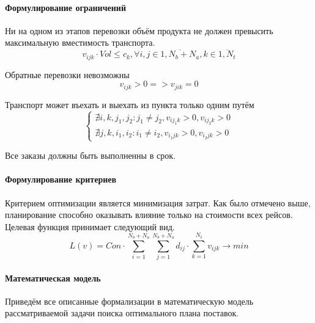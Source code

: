 	\paragraph{Формулирование ограничений}     
	Ни на одном из этапов перевозки объём продукта не должен превысить максимальную вместимость транспорта.
	\begin{equation}
		v_{ijk} \cdot Vol \le c_k, \forall i, j \in \overline{1, N_b+N_a}, k \in \overline{1, N_t}
	\end{equation}

	Обратные перевозки невозможны
	\begin{equation}
		v_{ijk} > 0 => v_{jik} = 0
	\end{equation}

	Транспорт может въехать и выехать из пункта только одним путём
	\begin{equation}
		\left\lbrace 
		\begin{array}{cols}
			\nexists i, k, j_1, j_2: j_1 \ne j_2, v_{ij_1k} > 0, v_{ij_2k} > 0 \\
			\nexists j, k, i_1, i_2: i_1 \ne i_2, v_{i_1jk} > 0, v_{i_2jk} > 0 
		\end{array}
	\end{equation}

	Все заказы должны быть выполненны в срок.	
	
	\paragraph{Формулирование критериев}   
	Критерием оптимизации является минимизация затрат. Как было отмечено выше, планирование способно оказывать влияние только на стоимости всех рейсов. Целевая функция принимает следующий вид.
	\begin{equation}
		L(v) = Con \cdot \sum_{i=1}^{N_b+N_a} \sum_{j=1}^{N_b+N_a} d_{ij} \cdot \sum_{k=1}^{N_t} v_{ijk} \to min
	\end{equation}

	\paragraph{Математическая модель}
	Приведём все описанные формализации в математическую модель рассматриваемой задачи поиска оптимального плана поставок.
	
